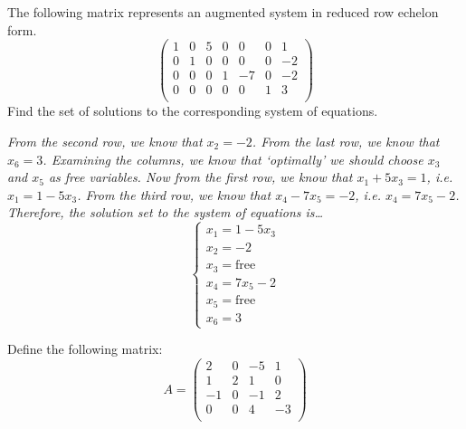 \documentclass[12pt,letterpaper]{exam}
\begin{document}
\begin{questions}





\newpage
\question[10] The following matrix represents an augmented system in reduced row echelon form. 
	\[
	\begin{pmatrix}
	1 & 0 & 5 & 0 & 0 & 0 & 1 \\
	0 & 1 & 0 & 0 & 0 & 0 & -2 \\
	0 & 0 & 0 & 1 & -7 & 0 & -2 \\
	0 & 0 & 0 & 0 & 0 & 1 & 3 \\
	\end{pmatrix}
	\] 
Find the set of solutions to the corresponding system of equations. \pspace

{\itshape From the second row, we know that $x_2= -2$. From the last row, we know that $x_6= 3$. Examining the columns, we know that `optimally' we should choose $x_3$ and $x_5$ as free variables. Now from the first row, we know that $x_1 + 5x_3= 1$, i.e. $x_1= 1 - 5x_3$. From the third row, we know that $x_4 - 7x_5= -2$, i.e. $x_4= 7x_5 - 2$. Therefore, the solution set to the system of equations is\dots
	\[
	\begin{cases}
	x_1= 1 - 5x_3 \\
	x_2= -2 \\
	x_3= \text{free} \\
	x_4= 7x_5 - 2 \\
	x_5= \text{free} \\
	x_6= 3	
	\end{cases}
	\]
}





\newpage
\question Define the following matrix:
	\[
	A= \left(
	\begin{array}{rrrr}
	2 & 0 & -5 & 1 \\
	1 & 2 & 1 & 0 \\
	-1 & 0 & -1 & 2 \\
	0 & 0 & 4 & -3 \\
	\end{array} \right)
	\]


\end{questions}
\end{document}
